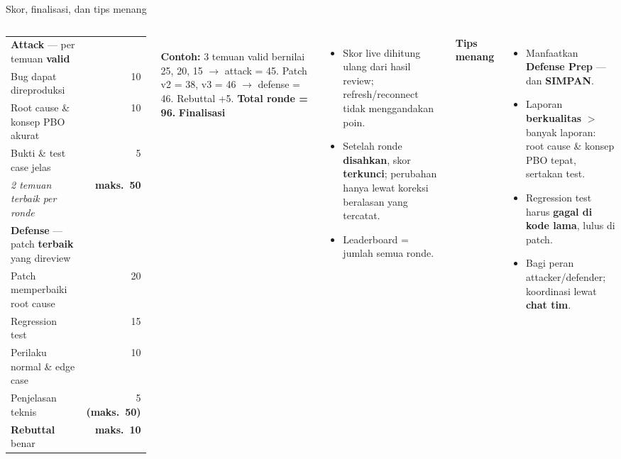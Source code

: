\documentclass[aspectratio=169,10pt]{beamer}
\newcommand{\hl}[1]{\textcolor{cyanx}{\textbf{#1}}}
\newcommand{\warn}[1]{\textcolor{redx}{\textbf{#1}}}
\begin{document}
\begin{frame}{Skor, finalisasi, dan tips menang}
\begin{columns}[T,onlytextwidth]
{\footnotesize
\renewcommand{\arraystretch}{1.15}
\begin{tabularx}{\linewidth}{@{}Lr@{}}\toprule
\textcolor{redx}{\textbf{Attack}} --- per temuan \textbf{valid} & \\
\quad Bug dapat direproduksi & 10\\
\quad Root cause \& konsep PBO akurat & 10\\
\quad Bukti \& test case jelas & 5\\
\quad \textit{2 temuan terbaik per ronde} & \textbf{maks.\ 50}\\\midrule
\textcolor{cyanx}{\textbf{Defense}} --- patch \textbf{terbaik} yang direview & \\
\quad Patch memperbaiki root cause & 20\\
\quad Regression test & 15\\
\quad Perilaku normal \& edge case & 10\\
\quad Penjelasan teknis & 5 \;\textbf{(maks.\ 50)}\\\midrule
\textcolor{purplex}{\textbf{Rebuttal}} benar & \textbf{maks.\ 10}\\\bottomrule
\end{tabularx}}
\\[0.3em]{\scriptsize\textbf{Contoh:} 3 temuan valid bernilai 25, 20, 15 $\rightarrow$ attack = 45. Patch v2 = 38, v3 = 46 $\rightarrow$ defense = 46. Rebuttal +5. \textbf{Total ronde = 96.}}
\textbf{Finalisasi}
\begin{itemize}\setlength\itemsep{0.1em}\footnotesize
  \item Skor live dihitung ulang dari hasil review; refresh/reconnect tidak menggandakan poin.
  \item Setelah ronde \textbf{disahkan}, skor \warn{terkunci}; perubahan hanya lewat koreksi beralasan yang tercatat.
  \item Leaderboard = jumlah semua ronde.
\end{itemize}
\textbf{Tips menang}
\begin{itemize}\setlength\itemsep{0.1em}\footnotesize
  \item Manfaatkan \textbf{Defense Prep} --- dan \textbf{SIMPAN}.
  \item Laporan \hl{berkualitas} $>$ banyak laporan: root cause \& konsep PBO tepat, sertakan test.
  \item Regression test harus \textbf{gagal di kode lama}, lulus di patch.
  \item Bagi peran attacker/defender; koordinasi lewat \textbf{chat tim}.
\end{itemize}
\end{columns}
\end{frame}
\end{document}
